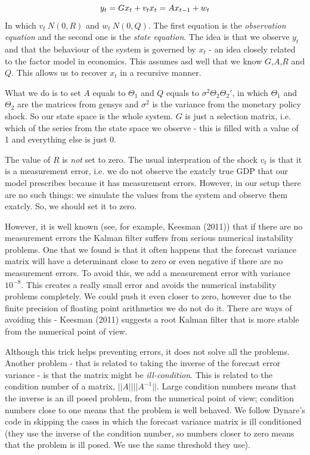 \documentclass[12pt,a4paper]{article}
\begin{document}
\[
y_t = Gx_t + v_t\\
x_t = Ax_{t-1} + w_t
\]
In which $v_t ~ N(0,R)$ and $w_t ~ N(0,Q)$. The first equation is the \emph{observation equation} and the second one is the \emph{state equation}. The idea is that we observe $y_t$ and that the behaviour of the system is governed by $x_t$ - an idea closely related to the factor model in economics. This assumes asd well that we know $G$,$A$,$R$ and $Q$. This allows us to recover $x_t$ in a recursive manner.

What we do is to set $A$ equals to $\Theta_1$ and $Q$ equals to $\sigma^2 \Theta_2 \Theta_2'$, in which $\Theta_1$ and $\Theta_2$ are the matrices from gensys and $\sigma^2$ is the variance from the monetary policy shock. So our state space is the whole system. $G$ is just a selection matrix, i.e. which of the series from the state space we observe - this is filled with a value of 1 and everything else is just 0.

The value of $R$ is \emph{not} set to zero. The usual interpration of the shock $v_t$ is that it is a measurement error, i.e. we do not observe the exatcly true GDP that our model prescribes because it has measurement errors. However, in our setup there are no such things: we simulate the values from the system and observe them exatcly. So, we should set it to zero.

However, it is well known (see, for example, Keesman (2011)) that if there are no measurement errors the Kalman filter suffers from serious numerical instability problems. One that we found is that it often happens that the forecast variance matrix will have a determinant close to zero or even negative if there are no measurement errors. To avoid this, we add a measurement error with variance $10^{-8}$. This creates a really small error and avoids the numerical instability problems completely. We could push it even closer to zero, however due to the finite precision of floating point arithmetics we do not do it. There are ways of avoiding this - Keesman (2011) suggests a root Kalman filter that is more stable from the numerical point of view.

Although this trick helps preventing errors, it does not solve all the problems. Another problem - that is related to taking the inverse of the forecast error variance - is that the matrix might be \emph{ill-condition}. This is related to the condition number of a matrix, $||A|| ||A^{-1}||$. Large condition numbers means that the inverse is an ill posed problem, from the numerical point of view; condition numbers close to one means that the problem is well behaved. We follow Dynare's code in skipping the cases in which the forecast variance matrix is ill conditioned (they use the inverse of the condition number, so numbers closer to zero means that the problem is ill posed. We use the same threshold they use).
\end{document}
